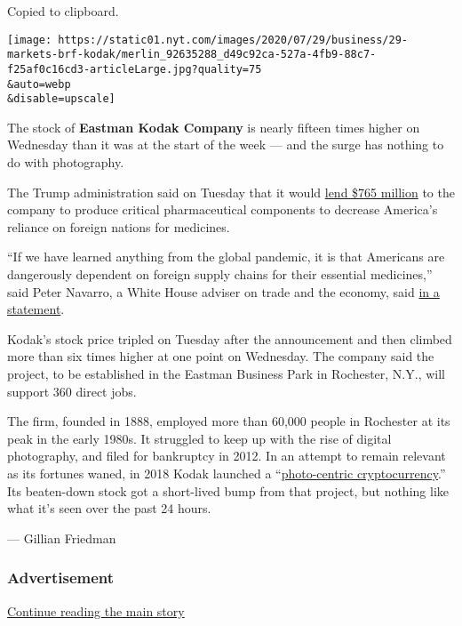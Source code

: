 Copied to clipboard.

\texttt{[image: https://static01.nyt.com/images/2020/07/29/business/29-markets-brf-kodak/merlin\_92635288\_d49c92ca-527a-4fb9-88c7-f25af0c16cd3-articleLarge.jpg?quality=75\\\&auto=webp\\\&disable=upscale]}

The stock of \textbf{Eastman Kodak Company} is nearly fifteen times
higher on Wednesday than it was at the start of the week --- and the
surge has nothing to do with photography.

The Trump administration said on Tuesday that it would
\href{https://www.nytimes.com/live/2020/07/28/business/stock-market-today-coronavirus/the-united-states-will-lend-kodak-765-million-to-make-drug-components}{lend
\$765 million} to the company to produce critical pharmaceutical
components to decrease America's reliance on foreign nations for
medicines.

``If we have learned anything from the global pandemic, it is that
Americans are dangerously dependent on foreign supply chains for their
essential medicines,'' said Peter Navarro, a White House adviser on
trade and the economy, said
\href{https://www.dfc.gov/media/press-releases/dfc-sign-letter-interest-investment-kodaks-expansion-pharmaceuticals}{in
a statement}.

Kodak's stock price tripled on Tuesday after the announcement and then
climbed more than six times higher at one point on Wednesday. The
company said the project, to be established in the Eastman Business Park
in Rochester, N.Y., will support 360 direct jobs.

The firm, founded in 1888, employed more than 60,000 people in Rochester
at its peak in the early 1980s. It struggled to keep up with the rise of
digital photography, and filed for bankruptcy in 2012. In an attempt to
remain relevant as its fortunes waned, in 2018 Kodak launched a
``\href{https://www.nytimes.com/2018/01/30/technology/kodak-blockchain-bitcoin.html}{photo-centric
cryptocurrency}.'' Its beaten-down stock got a short-lived bump from
that project, but nothing like what it's seen over the past 24 hours.

--- Gillian Friedman

\hypertarget{advertisement-1}{%
\subsubsection{Advertisement}\label{advertisement-1}}

\protect\hyperlink{after-dfp-ad-mid2}{Continue reading the main story}

